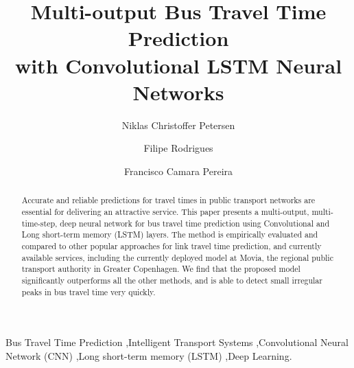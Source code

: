 ﻿\documentclass[preprint,11pt,5p,twocolumn]{elsarticle}
\begin{document}

\begin{frontmatter}



\title{Multi-output Bus Travel Time Prediction\\
with Convolutional LSTM Neural Networks}


\address[movia]{Public Transport Movia, Gammel Køge Landevej 3, 2500 Valby, Denmark}
\address[dtu]{Department of Management Engineering, Technical University of Denmark, 2800 Kongens Lyngby, Denmark}

\author[movia,dtu]{Niklas Christoffer Petersen}
\author[dtu]{Filipe Rodrigues}
\author[dtu]{Francisco Camara Pereira}


\begin{abstract}
Accurate and reliable predictions for travel times in public transport networks are essential for delivering an attractive service.
This paper presents a multi-output, multi-time-step, deep neural network for bus travel time prediction using Convolutional and Long short-term memory (LSTM) layers. The method is empirically evaluated and compared to other popular approaches for link travel time prediction, and currently available services, including the currently deployed model at Movia, the regional public transport authority in Greater Copenhagen. We find that the proposed model significantly outperforms all the other methods, and is able to detect small irregular peaks in bus travel time very quickly.
\end{abstract}

\begin{keyword}
Bus Travel Time Prediction \sep Intelligent Transport Systems \sep Convolutional Neural Network (CNN) \sep Long short-term memory (LSTM) \sep Deep Learning.
\end{keyword}

\end{frontmatter}
\end{document}

